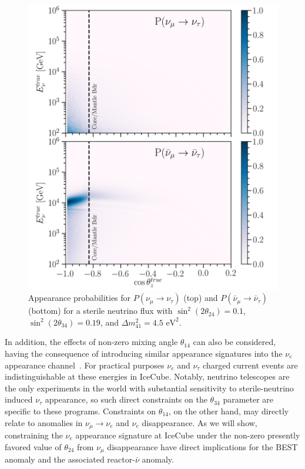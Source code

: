 \documentclass[main.tex]{subfiles}
\begin{document}
\begin{figure}
    \centering
    \includegraphics[width=0.98\linewidth]{figures/tau_odds.png}
    \caption{Appearance probabilities for $P(\nu_{\mu}\to\nu_{\tau})$ (top) and $P(\bar{\nu}_{\mu}\to\bar{\nu}_{\tau})$ (bottom) for a sterile neutrino flux with \(\sin^{2}(2\theta_{24})=0.1\), \(\sin^{2}(2\theta_{34})=0.19\), and \(\Delta m^{2}_{41}=4.5\text{ eV}^{2}\).}\label{fig:nunubar}
\end{figure}

In addition, the effects of non-zero mixing angle $\theta_{14}$ can also be considered, having the consequence of introducing similar appearance signatures into the $\nu_e$ appearance channel~\cite{wang2021search}. For practical purposes $\nu_e$ and $\nu_\tau$ charged current events are indistinguishable at these energies in IceCube.   Notably, neutrino telescopes are the only experiments in the world with substantial sensitivity to sterile-neutrino induced $\nu_\tau$ appearance, so such direct constraints on the $\theta_{34}$ parameter are specific to these programs. Constraints on $\theta_{14}$, on the other hand, may directly relate to anomalies in $\nu_\mu\rightarrow\nu_e$ and $\nu_e$ disappearance. As we will show, constraining the $\nu_e$ appearance signature at IceCube under the non-zero presently favored value of $\theta_{24}$ from $\nu_\mu$ disappearance have direct implications for the BEST anomaly and the associated reactor-$\bar{\nu}$ anomaly.
\end{document}
